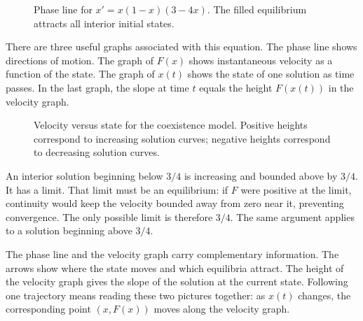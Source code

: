 \documentclass[11pt,oneside,openany]{book}
\theoremstyle{definition}
\theoremstyle{remark}
\numberwithin{equation}{chapter}
\begin{document}
\begin{figure}[htbp]
\centering
{}
\caption{Phase line for $x'=x(1-x)(3-4x)$. The filled equilibrium attracts all interior initial states.}
\end{figure}

There are three useful graphs associated with this equation. The phase line shows directions of motion. The graph of $F(x)$ shows instantaneous velocity as a function of the state. The graph of $x(t)$ shows the state of one solution as time passes. In the last graph, the slope at time $t$ equals the height $F(x(t))$ in the velocity graph.

\begin{figure}[htbp]
\centering
{}
\caption{Velocity versus state for the coexistence model. Positive heights correspond to increasing solution curves; negative heights correspond to decreasing solution curves.}
\end{figure}

An interior solution beginning below $3/4$ is increasing and bounded above by $3/4$. It has a limit. That limit must be an equilibrium: if $F$ were positive at the limit, continuity would keep the velocity bounded away from zero near it, preventing convergence. The only possible limit is therefore $3/4$. The same argument applies to a solution beginning above $3/4$.

The phase line and the velocity graph carry complementary information. The arrows show where the state moves and which equilibria attract. The height of the velocity graph gives the slope of the solution at the current state. Following one trajectory means reading these two pictures together: as $x(t)$ changes, the corresponding point $(x,F(x))$ moves along the velocity graph.
\end{document}
